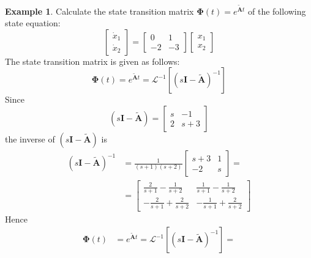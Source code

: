 \documentclass[11pt,a4paper,oneside]{book}
\numberwithin{equation}{section}
\theoremstyle{it}
\theoremstyle{definition}
\newtheorem{example}{Example}[chapter]
\begin{document}
\begin{example}
	Calculate the state transition matrix  $\mathbf{\Phi}(t) = e^{\tilde{\mathbf{A}}t}$ of the following state equation:
	\begin{equation}
		\left[ \begin{matrix}
			\dot{x}_1 \\[6pt]
			\dot{x}_2
		\end{matrix}\right] = 
		\left[ \begin{matrix}
			0 & 1 \\[6pt]
			-2 & -3
		\end{matrix}\right]
		\left[ \begin{matrix}
			{x}_1 \\[6pt]
			{x}_2
		\end{matrix}\right]
	\end{equation}
	The state transition matrix is given as follows:
	\begin{equation}
		\mathbf{\Phi}(t) = e^{\tilde{\mathbf{A}}t} = \mathcal{L}^{-1}\left[ \left(s\mathbf{I}-\tilde{\mathbf{A}} \right)^{-1} \right]
	\end{equation}
	Since
	\begin{equation}
		\left(s\mathbf{I}-\tilde{\mathbf{A}} \right) = 
		\left[ \begin{matrix}
			s & -1 \\[6pt] 2 & s+3
		\end{matrix}\right] 
	\end{equation}
	the inverse of $\left(s\mathbf{I}-\tilde{\mathbf{A}} \right)$ is 
	\begin{equation}
		\begin{aligned}
			\left(s\mathbf{I}-\tilde{\mathbf{A}} \right)^{-1} &= \frac{1}{(s+1)(s+2)}
			\left[ \begin{matrix}
				s+3 & 1 \\-2 & s
			\end{matrix}\right] = \\[8pt]
			&= \left[ \begin{matrix}
				\frac{2}{s+1}-\frac{1}{s+2} & \frac{1}{s+1}-\frac{1}{s+2} \\[8pt]
				-\frac{2}{s+1}+\frac{2}{s+2} & -\frac{1}{s+1}+\frac{2}{s+2}
			\end{matrix}\right] 
		\end{aligned}
	\end{equation}
	Hence
	\begin{equation}
		\begin{aligned}
			\mathbf{\Phi}(t) &= e^{\tilde{\mathbf{A}}t} = \mathcal{L}^{-1}\left[ \left(s\mathbf{I}-\tilde{\mathbf{A}} \right)^{-1} \right] = \\[8pt]

\end{aligned}
\end{equation}
\end{example}
\end{document}
